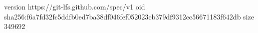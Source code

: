 version https://git-lfs.github.com/spec/v1
oid sha256:f6a7fd32fc5ddfb0ed7ba38df046fef052023cb379df9312cc56671183f642db
size 349692
